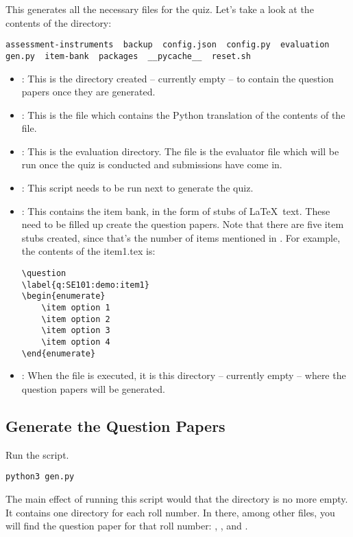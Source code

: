 \documentclass[12pt]{report}
\makeatletter
\newcommand{\kctt}[1]{{\color{Red}{\lstinline[basicstyle=\ttfamily, mathescape=true]@#1@}}}
\makeatother
\begin{document}
This generates all the necessary files for the quiz. Let's take a look at the contents of the directory:
\begin{lstlisting}[style=oc]
assessment-instruments  backup  config.json  config.py  evaluation  gen.py  item-bank  packages  __pycache__  reset.sh
\end{lstlisting}
\begin{itemize}
\item \kctt{assessment-instruments}: This is the directory created -- currently empty -- to contain the question papers once they are generated.
\item \kctt{config.py}: This is the file which contains the Python translation of the contents of the \kctt{config.json} file.
\item \kctt{evaluation}: This is the evaluation directory. The \kctt{evaluate.py} file is the evaluator file which will be run once the quiz is conducted and submissions have come in.
\item \kctt{gen.py}: This script needs to be run next to generate the quiz.
\item \kctt{item-bank}: This contains the item bank, in the form of stubs of \LaTeX\ text. These need to be filled up create the question papers. Note that there are five item stubs created, since that's the number of items mentioned in \kctt{config.json}. For example, the contents of the item1.tex is:
\begin{lstlisting}[basicstyle=\ttfamily\small, frame=single]
\question
\label{q:SE101:demo:item1}
\begin{enumerate}
	\item option 1
	\item option 2
	\item option 3
	\item option 4
\end{enumerate}

\end{lstlisting}
\item \kctt{packages}: When the \kctt{gen.py} file is executed, it is this directory -- currently empty -- where the question papers will be generated. 
\end{itemize}

\subsection{Generate the Question Papers}
Run the \kctt{gen.py} script.
\begin{lstlisting}[style=oc]
python3 gen.py
\end{lstlisting}
The main effect of running this script would that the \kctt{packages} directory is no more empty. It contains one directory for each roll number. In there, among other files, you will find the question paper for that roll number: \kctt{packages/rn1/rn1.pdf}, \kctt{packages/rn2/rn2.pdf}, \kctt{packages/rn3/rn3.pdf} and \kctt{packages/rn4/rn4.pdf}.
\end{document}
